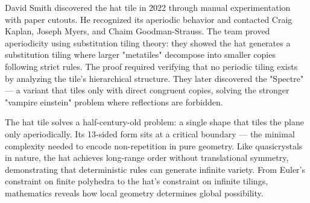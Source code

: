 David Smith discovered the hat tile in 2022 through manual experimentation with paper cutouts. He recognized its aperiodic behavior and contacted Craig Kaplan, Joseph Myers, and Chaim Goodman-Strauss. The team proved aperiodicity using substitution tiling theory: they showed the hat generates a substitution tiling where larger "metatiles" decompose into smaller copies following strict rules. The proof required verifying that no periodic tiling exists by analyzing the tile's hierarchical structure. They later discovered the "Spectre" — a variant that tiles only with direct congruent copies, solving the stronger "vampire einstein" problem where reflections are forbidden.

The hat tile solves a half-century-old problem: a single shape that tiles the plane only aperiodically. Its 13-sided form sits at a critical boundary — the minimal complexity needed to encode non-repetition in pure geometry. Like quasicrystals in nature, the hat achieves long-range order without translational symmetry, demonstrating that deterministic rules can generate infinite variety. From Euler's constraint on finite polyhedra to the hat's constraint on infinite tilings, mathematics reveals how local geometry determines global possibility.

